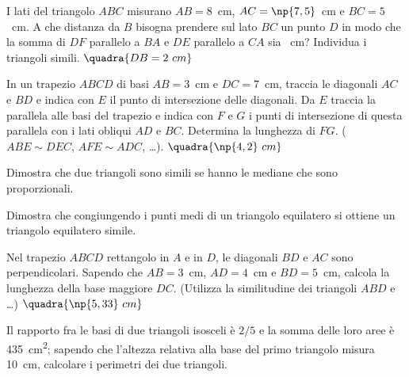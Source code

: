 \begin{multicols}{2}
\begin{esercizio}
\label{ese:6.79}
I lati del triangolo $ABC$ misurano $AB=8$~cm, $AC=\np{7,5}$~cm e 
$BC=5$~cm. A che distanza da $B$ bisogna prendere sul lato $BC$ un 
punto $D$ in modo che la somma di $DF$ parallelo a $BA$ e $DE$ 
parallelo a $CA$ sia ~cm? Individua i triangoli simili.
\hfill$\quadra{DB=2~cm}$
\end{esercizio}

\begin{esercizio}
\label{ese:6.81}
In un trapezio $ABCD$ di basi $AB=3$~cm e $DC=7$~cm, traccia le 
diagonali $AC$ e $BD$ e indica con $E$ il punto di intersezione delle 
diagonali. Da $E$ traccia la parallela alle basi del trapezio e 
indica con $F$ e $G$ i punti di intersezione di questa parallela con i 
lati obliqui $AD$ e $BC$. Determina la lunghezza di $FG$. ($ABE\sim 
DEC$, $AFE\sim ADC$, \ldots).
\hfill$\quadra{\np{4,2}~cm}$
\end{esercizio}

\begin{esercizio}
\label{ese:6.82}
Dimostra che due triangoli sono simili se hanno le mediane che sono 
proporzionali.
\end{esercizio}

\begin{esercizio}
\label{ese:6.83}
Dimostra che congiungendo i punti medi di un triangolo equilatero si 
ottiene un triangolo equilatero simile.
\end{esercizio}

\begin{esercizio}
\label{ese:6.84}
Nel trapezio $ABCD$ rettangolo in $A$ e in $D$, le diagonali $BD$ e 
$AC$ sono perpendicolari. Sapendo che $AB=3$~cm, $AD=4$~cm e 
$BD=5$~cm, calcola la lunghezza della base maggiore $DC$. (Utilizza 
la similitudine dei triangoli $ABD$ e \ldots{})
\hfill$\quadra{\np{5,33}~cm}$
\end{esercizio}

\begin{esercizio}
\label{ese:6.85}
Il rapporto fra le basi di due triangoli isosceli è $2/5$ e la somma 
delle loro aree è 435~cm\textsuperscript{2}; sapendo che l'altezza 
relativa alla base del primo triangolo misura 10~cm, calcolare i 
perimetri dei due triangoli. 
\end{esercizio}


\end{multicols}
